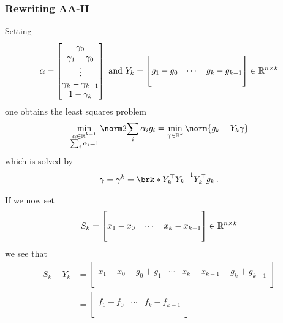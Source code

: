 \begin{frame}
	\frametitle{Rewriting AA-II}
	Setting 
	\begin{align*}
		\alpha=\begin{bmatrix} \gamma_0 \\ \gamma_1-\gamma_0 \\ \vdots \\ \gamma_{k}-\gamma_{k-1} \\ 1-\gamma_k \end{bmatrix}
		\text{ and }
		Y_k = \begin{bmatrix}
			& & \\
			g_{1}-g_0 & \cdots & g_{k}-g_{k-1} \\
			& &
		\end{bmatrix} \in\mathbb{R}^{n\times k}
	\end{align*}
	one obtains the least squares problem
	\begin{align*}
		\min_{\substack{\alpha\in\R^{k+1} \\ \sum_i\alpha_i=1}}\norm2{\sum_i\alpha_ig_i}
		= \min_{\gamma \in\R^k}\norm{g_k-Y_k\gamma}
	\end{align*}
	which is solved by
	\begin{align*}
		\gamma= \gamma^k = \brk*{Y_k^\top Y_k}^{-1}Y_k^\top g_k\,.
	\end{align*}
\end{frame}

\begin{frame}
	If we now set
	\begin{align*}
		S_k = \begin{bmatrix}
			& & \\
			x_1-x_0 & \cdots & x_{k}-x_{k-1} \\
			& & \\
		\end{bmatrix} \in\mathbb{R}^{n\times k}
	\end{align*}
	we see that
	\begin{align*}
		S_k -Y_k &= \begin{bmatrix}
			& & \\
			x_1-x_0-g_0+g_1 & \cdots & x_{k}-x_{k-1}-g_{k}+g_{k-1} \\
			& & \\
		\end{bmatrix} \\
		&= \begin{bmatrix}
			& & \\
			f_1-f_0 & \cdots & f_k-f_{k-1} \\
			& & \\
		\end{bmatrix}
	\end{align*}
\end{frame}

